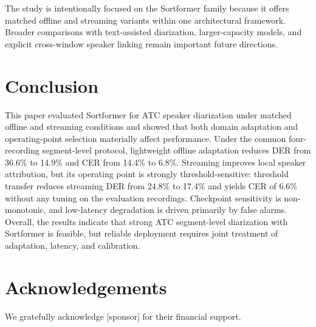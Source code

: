 \documentclass[conference]{IEEEtran}
\newif\ifidentifiedversion
\begin{document}
The study is intentionally focused on the Sortformer family because it offers matched offline and streaming variants within one architectural framework. Broader comparisons with text-assisted diarization, larger-capacity models, and explicit cross-window speaker linking remain important future directions.

\section{Conclusion}
\label{sec:conclusion}

This paper evaluated Sortformer for ATC speaker diarization under matched offline and streaming conditions and showed that both domain adaptation and operating-point selection materially affect performance. Under the common four-recording segment-level protocol, lightweight offline adaptation reduces DER from 36.6\% to 14.9\% and CER from 14.4\% to 6.8\%. Streaming improves local speaker attribution, but its operating point is strongly threshold-sensitive: threshold transfer reduces streaming DER from 24.8\% to 17.4\% and yields CER of 6.6\% without any tuning on the evaluation recordings. Checkpoint sensitivity is non-monotonic, and low-latency degradation is driven primarily by false alarms. Overall, the results indicate that strong ATC segment-level diarization with Sortformer is feasible, but reliable deployment requires joint treatment of adaptation, latency, and calibration.

\section*{Acknowledgements}
\ifidentifiedversion
We gratefully acknowledge Eclipse Aerospace Inc. for their financial support.
\else
We gratefully acknowledge [sponsor] for their financial support.
\fi



\end{document}
